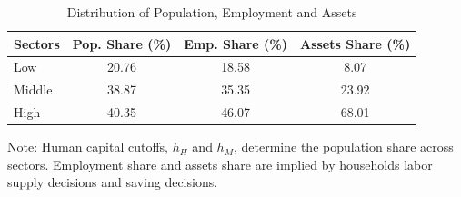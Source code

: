 \documentclass[12pt]{article}
\begin{document}
\begin{table}[htbp]
\begin{centering}
\caption{Distribution of Population, Employment and Assets}
\begin{tabular}{lccc}
\toprule 
Sectors  & \multicolumn{1}{l}{Pop. Share (\%)} & \multicolumn{1}{l}{Emp. Share (\%)} & \multicolumn{1}{l}{Assets Share (\%)}\tabularnewline
\midrule 
Low  & 20.76 & 18.58 & 8.07\tabularnewline
Middle  & 38.87 & 35.35 & 23.92\tabularnewline
High  & 40.35 & 46.07 & 68.01\tabularnewline
\bottomrule
\end{tabular}\label{tab:SSdistribution}
\par\end{centering}
{\scriptsize Note: Human capital cutoffs, $h_{H}$ and $h_{M}$, determine
the population share across sectors. Employment share and assets share
are implied by households labor supply decisions and saving decisions. }{\scriptsize\par}
\end{table}
\end{document}
